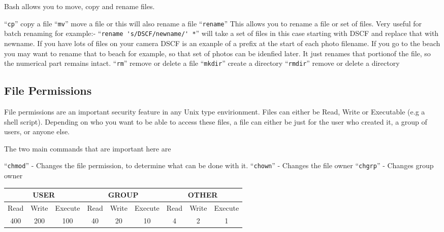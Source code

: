 \documentclass{extbook}
\begin{document}
Bash allows you to move, copy and rename files.   

``\verb|cp|'' copy a file
``\verb|mv|'' move a file or this will also rename a file
``\verb|rename|'' This allows you to rename a file or set of files.  Very useful for batch renaming for example:-
``\verb|rename 's/DSCF/newname/' *|'' will take a set of files in this case starting with DSCF and replace that with newname.  If you have lots of files on your camera DSCF is an exanple of a prefix at the start of each photo filename.   If you go to the beach you may want to rename that to beach for example, so that set of photos can be idenfied later.   It just renames that portionof the file, so the numerical part remains intact.  
``\verb|rm|'' remove or delete a file
``\verb|mkdir|'' create a directory
``\verb|rmdir|'' remove or delete a directory

\subsection{File Permissions}

File permissions are an important security feature in any Unix type envirionment.  Files can either be Read, Write or Executable (e.g a shell script).  Depending on who you want to be able to access these files,  a file can either be just for the user who created it, a group of users, or anyone else.  

The two main commands that are important here are

``\verb|chmod|'' - Changes the file permission, to determine what can be done with it. 
``\verb|chown|'' - Changes the file owner
``\verb|chgrp|'' - Changes group owner

\begin{table}[h]
\begin{tabular}{|ccc|ccc|ccc|}
\hline
\multicolumn{3}{|c|}{\textbf{USER}}                               & \multicolumn{3}{c|}{\textbf{GROUP}}                              & \multicolumn{3}{c|}{\textbf{OTHER}}                              \\ \hline
\multicolumn{1}{|c|}{Read} & \multicolumn{1}{c|}{Write} & Execute & \multicolumn{1}{c|}{Read} & \multicolumn{1}{c|}{Write} & Execute & \multicolumn{1}{c|}{Read} & \multicolumn{1}{c|}{Write} & Execute \\ \hline
\multicolumn{1}{|c|}{400}  & \multicolumn{1}{c|}{200}   & 100     & \multicolumn{1}{c|}{40}   & \multicolumn{1}{c|}{20}    & 10      & \multicolumn{1}{c|}{4}    & \multicolumn{1}{c|}{2}     & 1       \\ \hline
\end{tabular}
\end{table}
\end{document}
